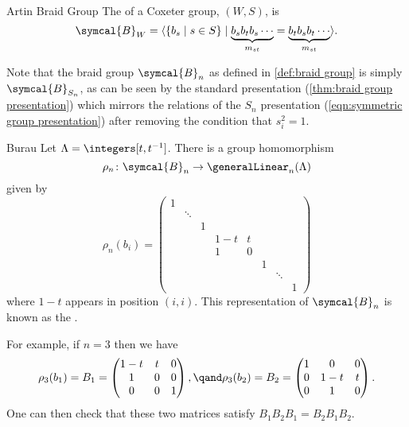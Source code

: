 \documentclass[fleqn]{NotesClass}
\newcommand{\braid}{\symcal{B}}
\begin{document}
    \begin{dfn}{Artin Braid Group}{}
        The  of a Coxeter group, \((W, S)\), is
        \begin{equation}
            \braid_W = \langle \{b_s \mid s \in S\} \mid \underbrace{b_s b_t b_s \dotsm}_{m_{st}} = \underbrace{b_t b_s b_t \dotsm}_{m_{st}} \rangle.
        \end{equation}
    \end{dfn}
    
    Note that the braid group \(\braid_n\) as defined in \cref{def:braid group} is simply \(\braid_{S_n}\), as can be seen by the standard presentation (\cref{thm:braid group presentation}) which mirrors the relations of the \(S_n\) presentation (\cref{eqn:symmetric group presentation}) after removing the condition that \(s_i^2 = 1\).
    
    \begin{prp}{Burau}{}
        Let \(\Lambda = \integers[t, t^{-1}]\).
        There is a group homomorphism
        \begin{equation}
            \rho_n \colon \braid_n \to \generalLinear_n(\Lambda)
        \end{equation}
        given by
        \begin{equation}
            \rho_n(b_i) = 
            \begin{pmatrix}
                1\\
                & \ddots \\
                & & 1 \\
                & & & 1 - t & t\\
                & & & 1 & 0 \\
                & & & & & 1\\
                & & & & & & \ddots\\
                & & & & & & & 1
            \end{pmatrix}
        \end{equation}
        where \(1 - t\) appears in position \((i, i)\).
        This representation of \(\braid_n\) is known as the .
    \end{prp}
    
    For example, if \(n = 3\) then we have
    \begin{equation}
        \rho_3(b_1) = B_1 = 
        \begin{pmatrix}
            1 - t & t & 0\\
            1 & 0 & 0\\
            0 & 0 & 1
        \end{pmatrix}
        , \qand \rho_3(b_2) = B_2 = 
        \begin{pmatrix}
            1 & 0 & 0\\
            0 & 1 - t & t\\
            0 & 1 & 0
        \end{pmatrix}
        .
    \end{equation}
    One can then check that these two matrices satisfy \(B_1B_2B_1 = B_2B_1B_2\).
    
\end{document}
